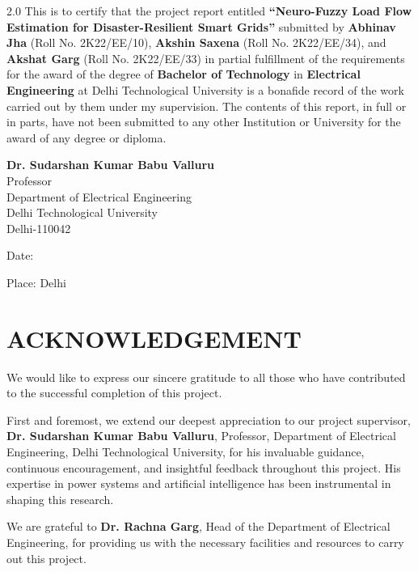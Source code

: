 \documentclass[12pt,a4paper]{report}
\newcommand{\projecttitle}{Neuro-Fuzzy Load Flow Estimation for Disaster-Resilient Smart Grids}
\newcommand{\authorone}{Abhinav Jha}
\newcommand{\rollone}{2K22/EE/10}
\newcommand{\authortwo}{Akshin Saxena}
\newcommand{\rolltwo}{2K22/EE/34}
\newcommand{\authorthree}{Akshat Garg}
\newcommand{\rollthree}{2K22/EE/33}
\newcommand{\supervisor}{Dr. Sudarshan Kumar Babu Valluru}
\begin{document}
\begin{spacing}{2.0}
This is to certify that the project report entitled \textbf{``\projecttitle''} submitted by \textbf{\authorone} (Roll No. \rollone), \textbf{\authortwo} (Roll No. \rolltwo), and \textbf{\authorthree} (Roll No. \rollthree) in partial fulfillment of the requirements for the award of the degree of \textbf{Bachelor of Technology} in \textbf{Electrical Engineering} at Delhi Technological University is a bonafide record of the work carried out by them under my supervision. The contents of this report, in full or in parts, have not been submitted to any other Institution or University for the award of any degree or diploma.

\vspace{20mm}

\noindent\textbf{\supervisor}\\
Professor\\
Department of Electrical Engineering\\
Delhi Technological University\\
Delhi-110042

\vspace{10mm}

\noindent Date: \hrulefill

\noindent Place: Delhi
\end{spacing}

\newpage


\chapter*{ACKNOWLEDGEMENT}
\thispagestyle{empty}

We would like to express our sincere gratitude to all those who have contributed to the successful completion of this project.

First and foremost, we extend our deepest appreciation to our project supervisor, \textbf{\supervisor}, Professor, Department of Electrical Engineering, Delhi Technological University, for his invaluable guidance, continuous encouragement, and insightful feedback throughout this project. His expertise in power systems and artificial intelligence has been instrumental in shaping this research.

We are grateful to \textbf{Dr. Rachna Garg}, Head of the Department of Electrical Engineering, for providing us with the necessary facilities and resources to carry out this project.
\end{document}

